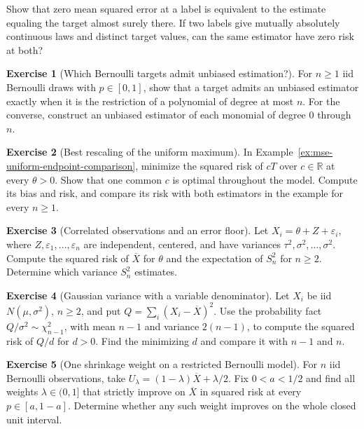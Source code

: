 \documentclass[11pt,oneside]{book}
\theoremstyle{definition}
\newtheorem{exercise}{Exercise}[section]
\theoremstyle{remark}
\newcommand{\R}{\mathbb R}
\begin{document}
\begin{practiceexercise}
\label{pex:mse-zero-risk}
Show that zero mean squared error at a label is equivalent to
the estimate equaling the target almost surely there. If two
labels give mutually absolutely continuous laws and distinct
target values, can the same estimator have zero risk at both?
\end{practiceexercise}

\begin{exercise}[Which Bernoulli targets admit unbiased estimation?]
\label{exer:unbiased-bernoulli-polynomial-targets}
For $n\geq1$ iid Bernoulli draws with $p\in[0,1]$, show that
a target admits an unbiased estimator exactly when it is the
restriction of a polynomial of degree at most $n$. For the
converse, construct an unbiased estimator of each monomial
of degree $0$ through $n$.
\end{exercise}

\begin{exercise}[Best rescaling of the uniform maximum]
\label{exer:mse-optimal-uniform-maximum-rescaling}
In Example~\ref{ex:mse-uniform-endpoint-comparison}, minimize
the squared risk of $cT$ over $c\in\R$ at every $\theta>0$.
Show that one common $c$ is optimal throughout the model.
Compute its bias and risk, and compare its risk with both
estimators in the example for every $n\geq1$.
\end{exercise}

\begin{exercise}[Correlated observations and an error floor]
\label{exer:mse-common-noise-floor}
Let $X_i=\theta+Z+\varepsilon_i$, where $Z,\varepsilon_1,\ldots,
\varepsilon_n$ are independent, centered, and have variances
$\tau^2,\sigma^2,\ldots,\sigma^2$. Compute the squared risk of
$\overline X$ for $\theta$ and the expectation of $S_n^2$
for $n\geq2$. Determine which variance $S_n^2$ estimates.
\end{exercise}

\begin{exercise}[Gaussian variance with a variable denominator]
\label{exer:mse-normal-variance-denominator}
Let $X_i$ be iid $N(\mu,\sigma^2)$, $n\geq2$, and put
$Q=\sum_i(X_i-\overline X)^2$. Use the probability fact
$Q/\sigma^2\sim\chi^2_{n-1}$, with mean $n-1$ and variance
$2(n-1)$, to compute the squared risk of $Q/d$ for
$d>0$. Find the minimizing $d$ and compare it with $n-1$ and $n$.
\end{exercise}

\begin{exercise}[One shrinkage weight on a restricted Bernoulli model]
\label{exer:mse-bernoulli-fixed-shrinkage-interval}
For $n$ iid Bernoulli observations, take
$U_\lambda=(1-\lambda)\overline X+\lambda/2$.
Fix $0<a<1/2$ and find all weights $\lambda\in(0,1]$
that strictly improve on $\overline X$ in squared risk at
every $p\in[a,1-a]$. Determine whether any such weight
improves on the whole closed unit interval.
\end{exercise}
\end{document}
